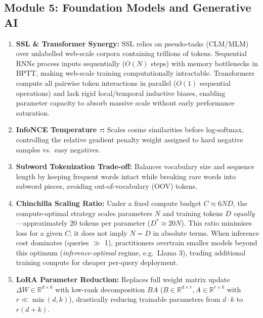 \documentclass[11pt,a4paper]{article}
\begin{document}
	\subsection*{Module 5: Foundation Models and Generative AI}
	\begin{enumerate}
		\item \textbf{SSL \& Transformer Synergy:} SSL relies on pseudo-tasks (CLM/MLM) over unlabelled web-scale corpora containing trillions of tokens. Sequential RNNs process inputs sequentially ($O(N)$ steps) with memory bottlenecks in BPTT, making web-scale training computationally intractable. Transformers compute all pairwise token interactions in parallel ($O(1)$ sequential operations) and lack rigid local/temporal inductive biases, enabling parameter capacity to absorb massive scale without early performance saturation.
		\item \textbf{InfoNCE Temperature $\tau$:} Scales cosine similarities before log-softmax, controlling the relative gradient penalty weight assigned to hard negative samples vs.\ easy negatives.
		\item \textbf{Subword Tokenization Trade-off:} Balances vocabulary size and sequence length by keeping frequent words intact while breaking rare words into subword pieces, avoiding out-of-vocabulary (OOV) tokens.
		\item \textbf{Chinchilla Scaling Ratio:} Under a fixed compute budget $C \approx 6ND$, the compute-optimal strategy scales parameters $N$ and training tokens $D$ \emph{equally}---approximately 20 tokens per parameter ($D^* \approx 20N$). This ratio minimises loss for a given $C$; it does not imply $N = D$ in absolute terms. When inference cost dominates (queries $\gg$ 1), practitioners overtrain smaller models beyond this optimum (\emph{inference-optimal} regime, e.g.\ Llama 3), trading additional training compute for cheaper per-query deployment.
		\item \textbf{LoRA Parameter Reduction:} Replaces full weight matrix update $\Delta W \in \mathbb{R}^{d \times k}$ with low-rank decomposition $B A$ ($B \in \mathbb{R}^{d \times r}, A \in \mathbb{R}^{r \times k}$ with $r \ll \min(d, k)$), drastically reducing trainable parameters from $d \cdot k$ to $r(d + k)$.
	\end{enumerate}
\end{document}
